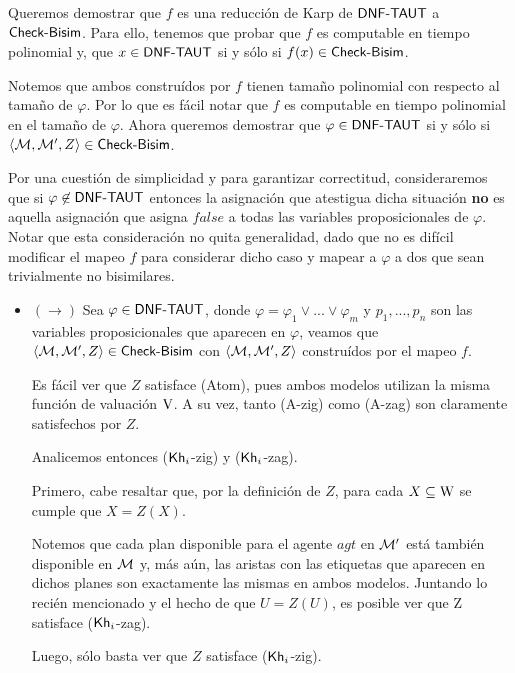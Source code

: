 \begin{demostracion}
    Queremos demostrar que $f$ es una reducción de Karp de $\rm\textsf{DNF-TAUT}$ a $\rm\textsf{Check-Bisim}$. Para ello, tenemos que probar que $f$ es computable 
    en tiempo polinomial y, que $x \in \rm\textsf{DNF-TAUT}$ si y sólo si $f(x) \in \rm\textsf{Check-Bisim}$.

    Notemos que ambos \ultss construídos por $f$ tienen tamaño polinomial con respecto al tamaño de $\varphi$. Por lo que es fácil notar 
    que $f$ es computable en tiempo polinomial en el tamaño de $\varphi$. Ahora queremos demostrar que $\varphi \in \rm\textsf{DNF-TAUT}$ si y sólo 
    si $\langle \mathcal{M},\mathcal{M}',Z \rangle \in \rm\textsf{Check-Bisim}$.

    Por una cuestión de simplicidad y para garantizar correctitud, consideraremos que si $\varphi \not\in \rm\textsf{DNF-TAUT}$ entonces la asignación 
    que atestigua dicha situación \textbf{no} es aquella asignación que asigna $false$ a todas las variables proposicionales de $\varphi$. 
    Notar que esta consideración no quita generalidad, dado que no es difícil modificar el mapeo $f$ para considerar dicho caso y 
    mapear a $\varphi$ a dos \ultss que sean trivialmente no bisimilares.  

    \begin{itemize}
    
    \item $(\rightarrow)$ Sea $\varphi \in \rm\textsf{DNF-TAUT}$, donde $\varphi = \varphi_1 \vee ... \vee \varphi_m$ y $p_1,...,p_n$ 
    son las variables proposicionales que aparecen en $\varphi$, veamos que $\langle \mathcal{M},\mathcal{M}',Z \rangle \in \rm\textsf{Check-Bisim}$ con 
    $\langle \mathcal{M},\mathcal{M}',Z \rangle$ construídos por el mapeo $f$.

    Es fácil ver que $Z$ satisface (Atom), pues ambos modelos utilizan la misma función de valuación $\mathrm{V}$. A su vez, 
    tanto (A-zig) como (A-zag) son claramente satisfechos por $Z$.

    Analicemos entonces ($\mathsf{Kh}_i$-zig) y ($\mathsf{Kh}_i$-zag).

    Primero, cabe resaltar que, por la definición de $Z$, para cada $X \subseteq \mathrm{W}$ se cumple que $X = Z(X)$.

    Notemos que cada plan disponible para el agente $agt$ en $\mathcal{M}'$ está también disponible en $\mathcal{M}$ y, más aún, 
    las aristas con las etiquetas que aparecen en dichos planes son exactamente las mismas en ambos modelos. Juntando lo recién 
    mencionado y el hecho de que $U = Z(U)$, es posible ver que Z satisface ($\mathsf{Kh}_i$-zag).

    Luego, sólo basta ver que $Z$ satisface ($\mathsf{Kh}_i$-zig).


\end{itemize}
\end{demostracion}
